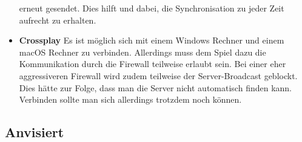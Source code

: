 \begin{itemize}
        erneut gesendet. Dies hilft und dabei, die Synchronisation zu jeder Zeit aufrecht zu erhalten.
    \item \textbf{Crossplay}
        Es ist möglich sich mit einem Windows Rechner und einem macOS Rechner zu verbinden. Allerdings muss dem Spiel dazu die Kommunikation durch die Firewall teilweise erlaubt sein.
        Bei einer eher aggressiveren Firewall wird zudem teilweise der Server-Broadcast geblockt. Dies hätte zur Folge, dass man die Server nicht automatisch finden kann. 
        Verbinden sollte man sich allerdings trotzdem noch können.   
\end{itemize}

\subsection{Anvisiert}
